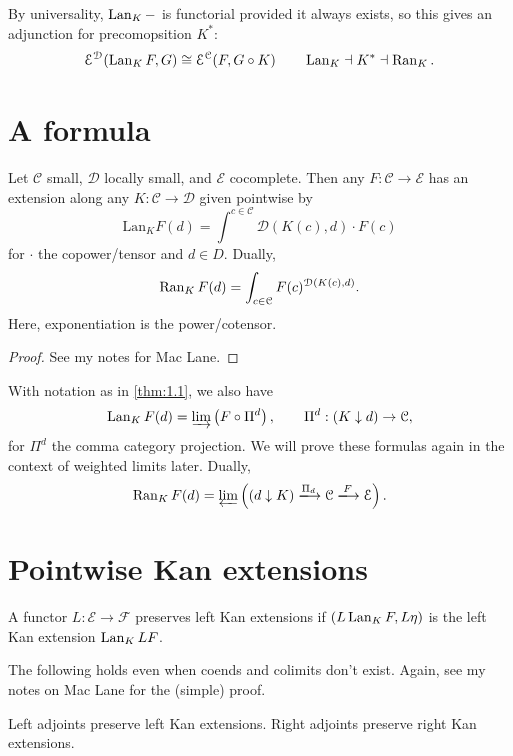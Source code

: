 By universality, $\operatorname{Lan}_K-$ is functorial provided it always exists, so this gives an adjunction for precomopsition $K^*$:
\[
	\mathcal{E} ^{\mathcal{D} } (\operatorname{Lan}_KF,G)\cong \mathcal{E} ^{\mathcal{C} } (F,G\circ K) \qquad \operatorname{Lan}_K\dashv K^*\dashv\operatorname{Ran}_K.
\]

\section{A formula}

\begin{theorem}\label{thm:1.1}
	Let $\mathcal{C} $ small, $\mathcal{D} $ locally small, and $\mathcal{E} $ cocomplete. Then any $F : \mathcal{C}  \to \mathcal{E} $ has an extension along any $K : \mathcal{C}  \to \mathcal{D} $ given pointwise by
	\[
		\mathrm{Lan} _KF(d)=\int^{c\in \mathcal{C} } \mathcal{D} (K(c),d)\cdot F(c)
	\]
	for $\cdot $ the copower/tensor and $d\in D$. Dually,
	\[
		\operatorname{Ran}_KF(d)=\int_{c\in \mathcal{C} } F(c)^{\mathcal{D} (K(c),d)} 
	.\]
	Here, exponentiation is the power/cotensor.
\end{theorem}
\begin{proof}
	See my notes for Mac Lane.
\end{proof}
\begin{theorem}\label{thm:1.2}
	With notation as in \ref{thm:1.1}, we also have
	\[
	\operatorname{Lan}_KF(d)=\varinjlim \left( F\circ \Pi^d \right) ,\qquad \Pi^d : (K\downarrow d) \to \mathcal{C} 
	,\]
for $\Pi^d$ the comma category projection. We will prove these formulas again in the context of weighted limits later. Dually,
\[
	 \Ran_KF(d)=\varprojlim \left( (d\downarrow K) \xlongrightarrow{\Pi_d} \mathcal{C} \xlongrightarrow{F} \mathcal{E}  \right)  
.\]
\end{theorem}

\section{Pointwise Kan extensions}

\begin{definition}[Preserves]\label{dfn:1.2}
	A functor $L : \mathcal{E}  \to \mathcal{F} $ preserves left Kan extensions if $(L\operatorname{Lan}_KF,L\eta)$ is the left Kan extension $\operatorname{Lan}_KLF$.
\end{definition}

The following holds even when coends and colimits don't exist. Again, see my notes on Mac Lane for the (simple) proof.
\begin{lemma}\label{lma:1.1}
	Left adjoints preserve left Kan extensions. Right adjoints preserve right Kan extensions.
\end{lemma}

